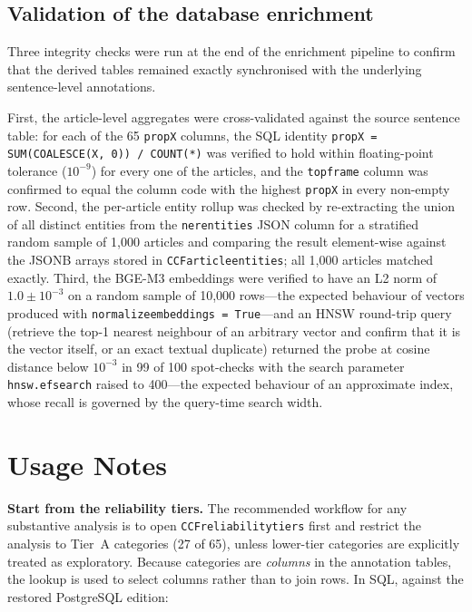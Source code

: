 \documentclass[12pt]{article}
\renewcommand\_{\texttt{\detokenize{_}\allowbreak}}
\begin{document}
\subsection{Validation of the database enrichment}
\label{subsec:enrichment_validation}

Three integrity checks were run at the end of the enrichment pipeline to confirm that the derived tables remained exactly synchronised with the underlying sentence-level annotations.

First, the article-level aggregates were cross-validated against the source sentence table: for each of the 65 \texttt{prop\_X} columns, the SQL identity \texttt{prop\_X = SUM(COALESCE(X, 0)) / COUNT(*)} was verified to hold within floating-point tolerance ($10^{-9}$) for every one of the \CCFarticles{} articles, and the \texttt{top\_frame} column was confirmed to equal the column code with the highest \texttt{prop\_X} in every non-empty row. Second, the per-article entity rollup was checked by re-extracting the union of all distinct entities from the \texttt{ner\_entities} JSON column for a stratified random sample of 1{,}000 articles and comparing the result element-wise against the JSONB arrays stored in \texttt{CCF\_article\_entities}; all 1{,}000 articles matched exactly. Third, the BGE-M3 embeddings were verified to have an L2 norm of $1.0 \pm 10^{-3}$ on a random sample of 10{,}000 rows---the expected behaviour of vectors produced with \texttt{normalize\_embeddings = True}---and an HNSW round-trip query (retrieve the top-1 nearest neighbour of an arbitrary vector and confirm that it is the vector itself, or an exact textual duplicate) returned the probe at cosine distance below $10^{-3}$ in 99 of 100 spot-checks with the search parameter \texttt{hnsw.ef\_search} raised to 400---the expected behaviour of an approximate index, whose recall is governed by the query-time search width.

\section{Usage Notes}
\label{sec:usage_notes}

\textbf{Start from the reliability tiers.} The recommended workflow for any substantive analysis is to open \texttt{CCF\_reliability\_tiers} first and restrict the analysis to Tier~A categories (27 of 65), unless lower-tier categories are explicitly treated as exploratory. Because categories are \emph{columns} in the annotation tables, the lookup is used to select columns rather than to join rows. In SQL, against the restored PostgreSQL edition:
\end{document}
